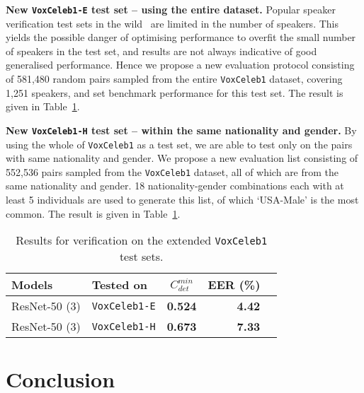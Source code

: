 \documentclass[a4paper]{article}
\def\newpara{\vspace{2pt}}
\def\aftertab{\vspace{-22pt}}
\begin{document}
\newpara\noindent\textbf{New \texttt{VoxCeleb1-E} test set --  using the entire dataset.}
Popular speaker verification test sets in the wild~\cite{Nagrani17, Mclaren16} are limited in the number of speakers. This yields the possible danger of optimising performance to overfit
the small number of speakers in the test set, and results are not
always indicative of good generalised performance. Hence we propose a
new evaluation protocol consisting of 581,480 random pairs sampled from the
entire \texttt{VoxCeleb1} dataset, covering 1,251 speakers, and set benchmark
performance for this test set.
The result is given in Table~\ref{table:results_vox1e}.


\newpara\noindent\textbf{New \texttt{VoxCeleb1-H} test set --  within the same nationality and gender.}
By using the whole of \texttt{VoxCeleb1} as a test set,  we are able to test only on the pairs with same nationality and gender. 
We propose a new evaluation list consisting of 552,536 pairs sampled from the 
\texttt{VoxCeleb1} dataset, all of which are from the same nationality
and gender. 18 nationality-gender combinations each with at least 5 individuals are used
to generate this list, of which `USA-Male' is the most common.
The result is given in Table~\ref{table:results_vox1e}.

\begin{table}[h!]
\centering
\footnotesize
\begin{tabular}{ l l c r  r  }

\textbf{Models} & \textbf{Tested on} & $C^{min}_{det}$ & EER (\%) \\ \hline  
 ResNet-50 (3) 			& \texttt{VoxCeleb1-E} & {\bf 0.524} & {\bf 4.42} \\ 
 ResNet-50 (3) 			& \texttt{VoxCeleb1-H} & {\bf 0.673} & {\bf 7.33} \\ 
\end{tabular} 
\vspace{3pt}

\caption{Results for verification on the extended {\tt VoxCeleb1} test sets.}
\label{table:results_vox1e}
\normalsize
\aftertab
\vspace{-10pt}
\end{table}

\section{Conclusion}
\end{document}
